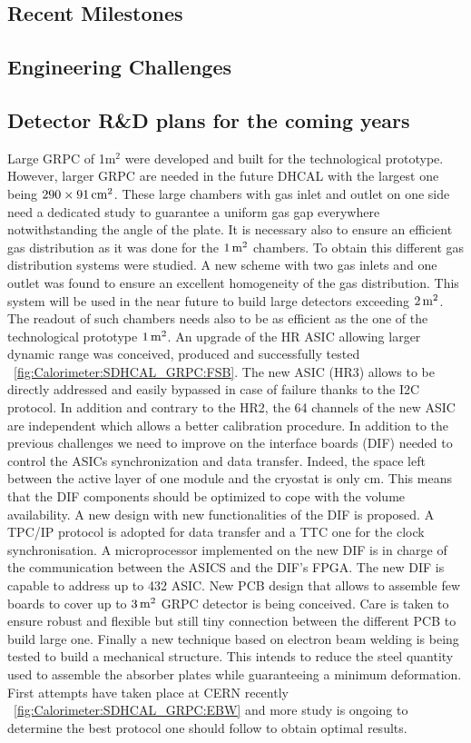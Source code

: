 \subsection{Recent Milestones}

\subsection{Engineering Challenges}
\subsection{Detector R\&D plans for the coming years}

Large GRPC of 1m$^2$ were developed and built for the technological prototype.
However, larger GRPC are needed in the future DHCAL with the largest one being
$\unit[290\times 91]{cm^2}$. These large chambers with gas inlet and outlet on one side need a
dedicated study to guarantee a uniform gas gap everywhere notwithstanding the
angle of the plate. It is necessary also to ensure an efficient gas distribution
as it was done for the $\unit[1]m^2$ chambers. To obtain this different gas distribution
systems were studied. A new scheme with two gas inlets and one outlet was found
to ensure an excellent homogeneity of the gas distribution. This system will be
used in the near future to build large detectors exceeding $\unit[2]{m^2}$. The readout
of such chambers needs also to be as efficient as the one of the technological
prototype $\unit[1]{m^2}$. An upgrade of the HR ASIC allowing larger dynamic range was
conceived, produced and successfully tested ~\ref{fig:Calorimeter:SDHCAL_GRPC:FSB}. The new ASIC (HR3)
allows to be directly addressed and easily bypassed in case of failure thanks to
the I2C protocol. In addition and contrary to the HR2, the 64 channels of the
new ASIC are independent which allows a better calibration procedure. In
addition to the previous challenges we need to improve on the interface boards
(DIF) needed to control the ASICs synchronization and data transfer. Indeed, the
space left between the active layer of one module and the cryostat is only \unit[5]{cm}.
This means that the DIF components should be optimized to cope with the volume
availability. A new design with new functionalities of the DIF is proposed. A
TPC/IP protocol is adopted for data transfer and a TTC one for the clock
synchronisation. A microprocessor implemented on the new DIF is in charge of
the communication between the ASICS and the DIF's FPGA. The new DIF is capable
to address up to 432 ASIC. New PCB design that allows to assemble few boards to
cover up to $\unit[3]{m^2}$ GRPC detector is being conceived. Care is taken to ensure
robust and flexible but still tiny connection between the different PCB to build
large one. Finally a new technique based on electron beam welding is being
tested to build a mechanical structure. This intends to reduce the steel
quantity used to assemble the absorber plates while guaranteeing a minimum
deformation. First attempts have taken place at CERN recently ~\ref{fig:Calorimeter:SDHCAL_GRPC:EBW} and
more study is ongoing to determine the best protocol one should follow to obtain
optimal results.

